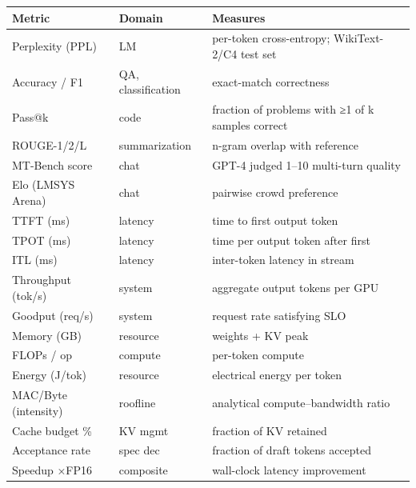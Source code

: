 {\def\LTcaptype{none} %
\begin{longtable}[]{@{}
  >{\raggedright\arraybackslash}p{}
  >{\raggedright\arraybackslash}p{}
  >{\raggedright\arraybackslash}p{}@{}}
\toprule\noalign{}
\begin{minipage}[b]{\linewidth}\raggedright
Metric
\end{minipage} & \begin{minipage}[b]{\linewidth}\raggedright
Domain
\end{minipage} & \begin{minipage}[b]{\linewidth}\raggedright
Measures
\end{minipage} \\
\midrule\noalign{}
\endhead
\bottomrule\noalign{}
\endlastfoot
Perplexity (PPL) & LM & per-token cross-entropy; WikiText-2/C4 test set \\
Accuracy / F1 & QA, classification & exact-match correctness \\
Pass@k & code & fraction of problems with ≥1 of k samples correct \\
ROUGE-1/2/L & summarization & n-gram overlap with reference \\
MT-Bench score & chat & GPT-4 judged 1--10 multi-turn quality \\
Elo (LMSYS Arena) & chat & pairwise crowd preference \\
TTFT (ms) & latency & time to first output token \\
TPOT (ms) & latency & time per output token after first \\
ITL (ms) & latency & inter-token latency in stream \\
Throughput (tok/s) & system & aggregate output tokens per GPU \\
Goodput (req/s) & system & request rate satisfying SLO \\
Memory (GB) & resource & weights + KV peak \\
FLOPs / op & compute & per-token compute \\
Energy (J/tok) & resource & electrical energy per token \\
MAC/Byte (intensity) & roofline & analytical compute--bandwidth ratio \\
Cache budget \% & KV mgmt & fraction of KV retained \\
Acceptance rate & spec dec & fraction of draft tokens accepted \\
Speedup ×FP16 & composite & wall-clock latency improvement \\
\end{longtable}
}

